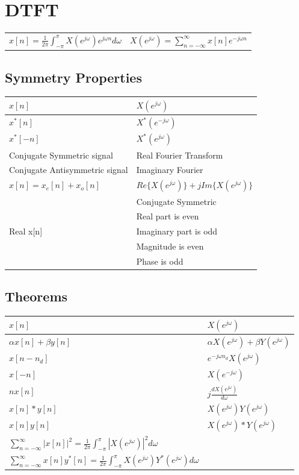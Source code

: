 \documentclass{article}
\begin{document}
\section*{DTFT}
\begin{center}
    \begin{tabular}{cc}
        $x[n] = \frac{1}{2\pi}\int_{-\pi}^{\pi}{X(e^{j\omega})e^{j\omega n}d\omega}$ & $X(e^{j\omega}) = \sum_{n=-\infty}^{\infty}{x[n]e^{-j\omega n}}$
    \end{tabular}
\end{center}
\subsection*{Symmetry Properties}
\begin{center}
    \begin{tabularx}{\textwidth}{XX}
        \hline
        $x[n]$ & $X(e^{j\omega})$\\
        \hline
        $x^*[n]$ & $X^*(e^{-j\omega})$\\
        $x^*[-n]$ & $X^*(e^{j\omega})$\\
        Conjugate Symmetric signal & Real Fourier Transform\\
        Conjugate Antisymmetric signal & Imaginary Fourier\\
        $x[n]=x_e[n]+x_o[n]$ & $Re\{X(e^{j\omega})\}+jIm\{X(e^{j\omega})\}$\\
        \hline
         & Conjugate Symmetric\\
         & Real part is even\\
         Real x[n] & Imaginary part is odd\\
         & Magnitude is even\\
         & Phase is odd\\
    \end{tabularx}
\end{center}
\subsection*{Theorems}
\begin{center}
    \begin{tabularx}{\textwidth}{XX}
        \hline
        $x[n]$ & $X(e^{j\omega})$\\
        \hline
        $\alpha x[n]+\beta y[n]$ & $\alpha X(e^{j\omega}) + \beta Y(e^{j\omega})$\\
        $x[n-n_d]$ & $e^{-j\omega n_d}X(e^{j\omega})$\\
        $x[-n]$ & $X(e^{-j\omega})$\\
        $nx[n]$ & $j\frac{dX(e^{j\omega})}{d\omega}$\\
        $x[n] * y[n]$ & $X(e^{j\omega})Y(e^{j\omega})$\\
        $x[n]y[n]$ & $X(e^{j\omega}) * Y(e^{j\omega})$\\
        $\sum_{n=-\infty}^{\infty}{|x[n]|^2}=\frac{1}{2\pi}\int_{-\pi}^{\pi}{|X(e^{j\omega})|^2d\omega}$ & \\
        $\sum_{n=-\infty}^{\infty}{x[n]y^*[n]}=\frac{1}{2\pi}\int_{-\pi}^{\pi}{X(e^{j\omega})Y^*(e^{j\omega})d\omega}$ &\\
    \end{tabularx}
\end{center}
\end{document}
